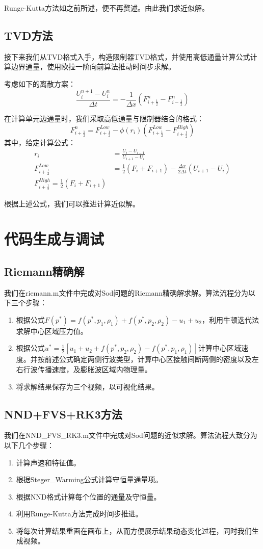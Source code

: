 \documentclass[12pt,a4paper]{article}%
\begin{document}
		Runge-Kutta方法如之前所述，便不再赘述。由此我们求近似解。
		
		\subsection{TVD方法}
		接下来我们从TVD格式入手，构造限制器TVD格式，并使用高低通量计算公式计算边界通量，使用欧拉一阶向前算法推动时间步求解。
		
		考虑如下的离散方案：
		\[
			\frac{U_i^{n+1} - U_i^n}{\Delta t} = -\frac{1}{\Delta x}(F^n_{i+\frac12} - F^n_{i-\frac12})
		\]
		
		在计算单元边通量时，我们采取高低通量与限制器结合的格式：
		\[
			F^n_{i+\frac12} = F^{Low}_{i+\frac12} - \phi(r_i)(F^{Low}_{i+\frac12} - F^{High}_{i+\frac12})
		\]
		其中，给定计算公式：
		\[
			\begin{aligned}
				r_i &= \frac{U_i - U_{i-1}}{U_{i+1} - U_i} \\
				F^{Low}_{i+\frac12} &= \frac12(F_i + F_{i+1}) - \frac{\Delta x}{2\Delta t}(U_{i+1} - U_i) \\
				F^{High}_{i+\frac12} = \frac12(F_i + F_{i+1})
			\end{aligned}
		\]
		
		根据上述公式，我们可以推进计算近似解。
		
		
	\section{代码生成与调试}
		\subsection{Riemann精确解}
		我们在riemann.m文件中完成对Sod问题的Riemann精确解求解。算法流程分为以下三个步骤：
		\begin{enumerate}
			\item 根据公式$F(p^*) = f(p^*,p_1,\rho_1) + f(p^*,p_2,\rho_2) - u_1 + u_2$，利用牛顿迭代法求解中心区域压力值。
			\item 根据公式$u^* = \frac{1}{2}[u_1 + u_2 + f(p^*,p_2,\rho_2) - f(p^*,p_1,\rho_1)]$计算中心区域速度。并按前述公式确定两侧行波类型，计算中心区接触间断两侧的密度以及左右行波传播速度，及膨胀波区域内物理量。
			\item 将求解结果保存为三个视频，以可视化结果。
		\end{enumerate}
		
		\subsection{NND+FVS+RK3方法}
		我们在NND\_FVS\_RK3.m文件中完成对Sod问题的近似求解。算法流程大致分为以下几个步骤：
		\begin{enumerate}
			\item 计算声速和特征值。
			\item 根据Steger\_Warming公式计算守恒量通量项。
			\item 根据NND格式计算每个位置的通量及守恒量。
			\item 利用Runge-Kutta方法完成时间步推进。
			\item 将每次计算结果重画在画布上，从而方便展示结果动态变化过程，同时我们生成视频。
		\end{enumerate}
		
\end{document}
